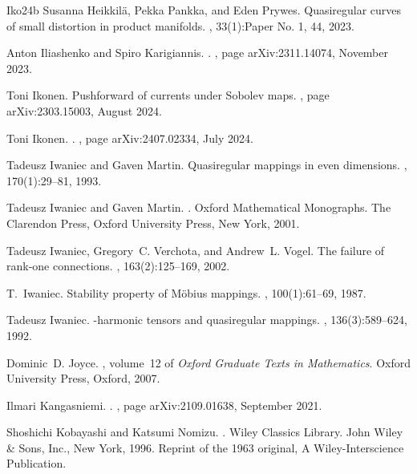 \documentclass[a4paper,leqno,11pt]{amsart}
\numberwithin{equation}{section}
\theoremstyle{remark}
\theoremstyle{remark}
\begin{document}
\begin{thebibliography}{{Iko}24b}
Susanna Heikkil\"{a}, Pekka Pankka, and Eden Prywes.
\newblock Quasiregular curves of small distortion in product manifolds.
, 33(1):Paper No. 1, 44, 2023.

Anton {Iliashenko} and Spiro {Karigiannis}.
.
, page arXiv:2311.14074, November 2023.

Toni Ikonen.
\newblock Pushforward of currents under {S}obolev maps.
, page arXiv:2303.15003, August 2024.

Toni {Ikonen}.
.
, page arXiv:2407.02334, July 2024.

Tadeusz Iwaniec and Gaven Martin.
\newblock Quasiregular mappings in even dimensions.
, 170(1):29--81, 1993.

Tadeusz Iwaniec and Gaven Martin.
.
\newblock Oxford Mathematical Monographs. The Clarendon Press, Oxford University Press, New York, 2001.

Tadeusz Iwaniec, Gregory~C. Verchota, and Andrew~L. Vogel.
\newblock The failure of rank-one connections.
, 163(2):125--169, 2002.

T.~Iwaniec.
\newblock Stability property of {M}\"obius mappings.
, 100(1):61--69, 1987.

Tadeusz Iwaniec.
-harmonic tensors and quasiregular mappings.
, 136(3):589--624, 1992.

Dominic~D. Joyce.
, volume~12 of {\em Oxford Graduate Texts in Mathematics}.
\newblock Oxford University Press, Oxford, 2007.

Ilmari {Kangasniemi}.
.
, page arXiv:2109.01638, September 2021.

Shoshichi Kobayashi and Katsumi Nomizu.
.
\newblock Wiley Classics Library. John Wiley \& Sons, Inc., New York, 1996.
\newblock Reprint of the 1963 original, A Wiley-Interscience Publication.


\end{thebibliography}
\end{document}
